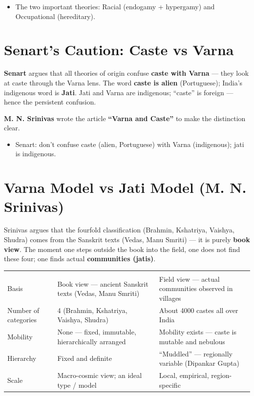 \begin{QuickRevision}
\begin{itemize}
\item The two important theories: Racial (endogamy + hypergamy) and Occupational (hereditary).
\end{itemize}
\end{QuickRevision}

\section{Senart's Caution: Caste vs Varna}

\textbf{Senart} argues that all theories of origin confuse \textbf{caste with Varna} --- they look at caste through the Varna lens. The word \textbf{caste is alien} (Portuguese); India's indigenous word is \textbf{Jati}. Jati and Varna are indigenous; ``caste'' is foreign --- hence the persistent confusion.

\textbf{M. N. Srinivas} wrote the article \textbf{``Varna and Caste''} to make the distinction clear.

\begin{QuickRevision}
\begin{itemize}
\item Senart: don't confuse caste (alien, Portuguese) with Varna (indigenous); jati is indigenous.
\end{itemize}
\end{QuickRevision}

\section{Varna Model vs Jati Model (M. N. Srinivas)}

Srinivas argues that the fourfold classification (Brahmin, Kshatriya, Vaishya, Shudra) comes from the Sanskrit texts (Vedas, Manu Smriti) --- it is purely \textbf{book view}. The moment one steps outside the book into the field, one does not find these four; one finds actual \textbf{communities (jatis)}.

\begin{center}
\begin{tabularx}{\textwidth}{YYY}
 &  &  \\
Basis & Book view --- ancient Sanskrit texts (Vedas, Manu Smriti) & Field view --- actual communities observed in villages \\
Number of categories & 4 (Brahmin, Kshatriya, Vaishya, Shudra) & About 4000 castes all over India \\
Mobility & None --- fixed, immutable, hierarchically arranged & Mobility exists --- caste is mutable and nebulous \\
Hierarchy & Fixed and definite & ``Muddled'' --- regionally variable (Dipankar Gupta) \\
Scale & Macro-cosmic view; an ideal type / model & Local, empirical, region-specific \\
\end{tabularx}
\end{center}

